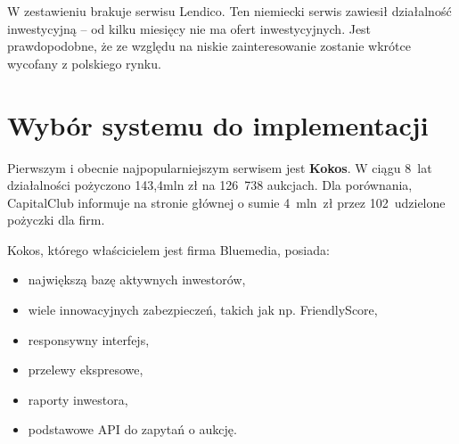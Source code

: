 \documentclass[a4paper,twoside,titlepage,openright]{book}
\begin{document}
\begin{small}
\noindent
{}
\end{small}

W zestawieniu brakuje serwisu Lendico. Ten niemiecki serwis zawiesił działalność inwestycyjną -- od kilku miesięcy nie ma ofert inwestycyjnych. Jest prawdopodobne, że ze względu na niskie zainteresowanie zostanie wkrótce wycofany z polskiego rynku.

\section{Wybór systemu do implementacji}

Pierwszym i obecnie najpopularniejszym serwisem jest \textbf{Kokos}. W ciągu 8~lat działalności pożyczono 143,4mln zł na 126~738 aukcjach. Dla porównania, CapitalClub informuje na stronie głównej o sumie 4~mln~zł przez 102~udzielone pożyczki dla firm. 

Kokos, którego właścicielem jest firma Bluemedia, posiada:
\begin{itemize}
\item największą bazę aktywnych inwestorów,
\item wiele innowacyjnych zabezpieczeń, takich jak np. FriendlyScore,
\item responsywny interfejs,
\item przelewy ekspresowe,
\item raporty inwestora,
\item podstawowe API do zapytań o aukcję.
\end{itemize}
\end{document}
